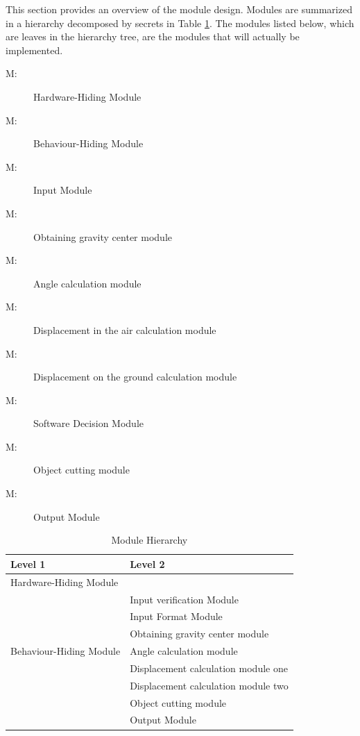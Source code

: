\documentclass[12pt, titlepage]{article}
\newcounter{mnum}
\newcommand{\mthemnum}{M\themnum}
\begin{document}
	This section provides an overview of the module design. Modules are summarized
	in a hierarchy decomposed by secrets in Table \ref{TblMH}. The modules listed
	below, which are leaves in the hierarchy tree, are the modules that will
	actually be implemented.
	
	\begin{description}
		\item [ \mthemnum \label{mHH}:] Hardware-Hiding Module
		\item [ \mthemnum \label{mBH}:] Behaviour-Hiding Module
		\item [ \mthemnum \label{mIF}:] Input Module
		\item [ \mthemnum \label{mOGC}:] Obtaining gravity center module
		\item [ \mthemnum \label{mAC}:] Angle calculation module
		\item [ \mthemnum \label{mDC1}:] Displacement in the air calculation module
		\item [ \mthemnum \label{mDC2}:] Displacement on the ground calculation module
		\item [ \mthemnum \label{mSD}:] Software Decision Module
		\item [ \mthemnum \label{mOC}:] Object cutting module
		\item [ \mthemnum \label{mOM}:] Output Module
	\end{description}
	
	
	\begin{table}[h!]
		\centering
		\begin{tabular}{p{} p{}}
			\toprule
			\textbf{Level 1} & \textbf{Level 2}\\
			\midrule
			
			{Hardware-Hiding Module} & ~ \\
			\midrule
			
			\multirow{7}{0.3\textwidth}{Behaviour-Hiding Module} & Input verification Module\\
			& Input Format Module\\
			& Obtaining gravity center module\\
			& Angle calculation module\\
			& Displacement calculation module one\\
			& Displacement calculation module two\\
			\midrule
			
			\multirow{3}{0.3\textwidth}{Software Decision Module} & Object cutting module\\
			& Output Module\\
			\bottomrule
			
		\end{tabular}
		\caption{Module Hierarchy}
		\label{TblMH}
	\end{table}
	
\end{document}
